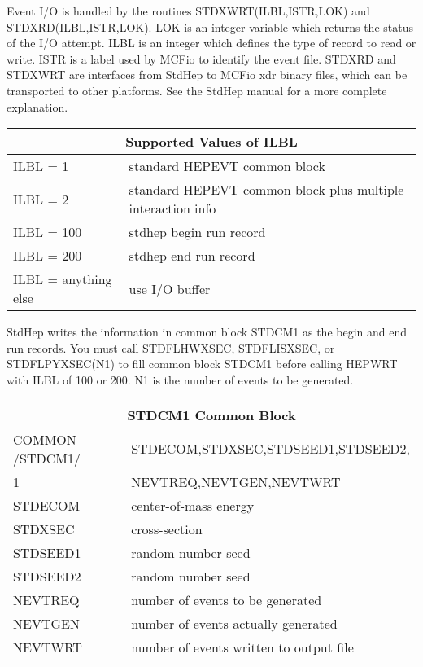 \vspace{0.2 in}

Event I/O is handled by the routines STDXWRT(ILBL,ISTR,LOK) and 
STDXRD(ILBL,ISTR,LOK). 
LOK is an integer variable which returns the status of the I/O attempt.
ILBL is an integer which defines the type of record to read or write.
ISTR is a label used by MCFio to identify the event file.
STDXRD and STDXWRT are interfaces from StdHep to MCFio xdr binary files,
which can be transported to other platforms.  See the StdHep manual
for a more complete explanation.

\vspace{0.2 in}

\begin{tabular}{|ll|} \hline
\multicolumn{2}{|c|}{Supported Values of ILBL} \\  \hline
ILBL = 1    &  standard HEPEVT common block \\
ILBL = 2    &  standard HEPEVT common block plus multiple interaction info \\
ILBL = 100  &  stdhep begin run record \\
ILBL = 200  &  stdhep end run record \\
ILBL = anything else  &  use I/O buffer \\ \hline
\end{tabular}

\vspace{0.2 in}

StdHep writes the information in common block STDCM1 as the begin and
end run records.
You must call STDFLHWXSEC, STDFLISXSEC, or STDFLPYXSEC(N1) to fill
common block STDCM1 before calling HEPWRT with ILBL of 100 or 200.  
N1 is the number of events to be generated.


\vspace{0.2 in}

\begin{tabular}{|ll|} \hline
\multicolumn{2}{|c|}{STDCM1 Common Block} \\  \hline
      COMMON /STDCM1/ & STDECOM,STDXSEC,STDSEED1,STDSEED2, \\
     1            &   NEVTREQ,NEVTGEN,NEVTWRT \\ \hline
   STDECOM  & center-of-mass energy \\
   STDXSEC  & cross-section \\
   STDSEED1 & random number seed \\
   STDSEED2 & random number seed \\
   NEVTREQ  & number of events to be generated \\
   NEVTGEN  & number of events actually generated \\
   NEVTWRT  & number of events written to output file \\ \hline
\end{tabular}

